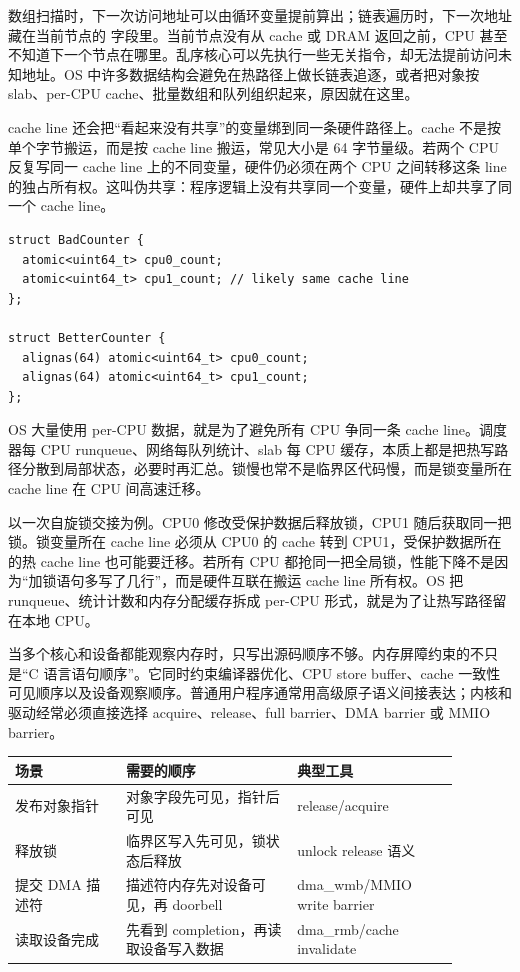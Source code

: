 数组扫描时，下一次访问地址可以由循环变量提前算出；链表遍历时，下一次地址藏在当前节点的  字段里。当前节点没有从 cache 或 DRAM 返回之前，CPU 甚至不知道下一个节点在哪里。乱序核心可以先执行一些无关指令，却无法提前访问未知地址。OS 中许多数据结构会避免在热路径上做长链表追逐，或者把对象按 slab、per-CPU cache、批量数组和队列组织起来，原因就在这里。

cache line 还会把“看起来没有共享”的变量绑到同一条硬件路径上。cache 不是按单个字节搬运，而是按 cache line 搬运，常见大小是 64 字节量级。若两个 CPU 反复写同一 cache line 上的不同变量，硬件仍必须在两个 CPU 之间转移这条 line 的独占所有权。这叫伪共享：程序逻辑上没有共享同一个变量，硬件上却共享了同一个 cache line。

\begin{lstlisting}
struct BadCounter {
  atomic<uint64_t> cpu0_count;
  atomic<uint64_t> cpu1_count; // likely same cache line
};

struct BetterCounter {
  alignas(64) atomic<uint64_t> cpu0_count;
  alignas(64) atomic<uint64_t> cpu1_count;
};
\end{lstlisting}

OS 大量使用 per-CPU 数据，就是为了避免所有 CPU 争同一条 cache line。调度器每 CPU runqueue、网络每队列统计、slab 每 CPU 缓存，本质上都是把热写路径分散到局部状态，必要时再汇总。锁慢也常不是临界区代码慢，而是锁变量所在 cache line 在 CPU 间高速迁移。

以一次自旋锁交接为例。CPU0 修改受保护数据后释放锁，CPU1 随后获取同一把锁。锁变量所在 cache line 必须从 CPU0 的 cache 转到 CPU1，受保护数据所在的热 cache line 也可能要迁移。若所有 CPU 都抢同一把全局锁，性能下降不是因为“加锁语句多写了几行”，而是硬件互联在搬运 cache line 所有权。OS 把 runqueue、统计计数和内存分配缓存拆成 per-CPU 形式，就是为了让热写路径留在本地 CPU。

当多个核心和设备都能观察内存时，只写出源码顺序不够。内存屏障约束的不只是“C 语言语句顺序”。它同时约束编译器优化、CPU store buffer、cache 一致性可见顺序以及设备观察顺序。普通用户程序通常用高级原子语义间接表达；内核和驱动经常必须直接选择 acquire、release、full barrier、DMA barrier 或 MMIO barrier。

\begin{longtable}{p{0.22\linewidth}p{0.34\linewidth}p{0.32\linewidth}}
\toprule
场景 & 需要的顺序 & 典型工具 \\
\midrule
发布对象指针 & 对象字段先可见，指针后可见 & release/acquire \\
释放锁 & 临界区写入先可见，锁状态后释放 & unlock release 语义 \\
提交 DMA 描述符 & 描述符内存先对设备可见，再 doorbell & dma\_wmb/MMIO write barrier \\
读取设备完成 & 先看到 completion，再读取设备写入数据 & dma\_rmb/cache invalidate \\
\bottomrule
\end{longtable}

